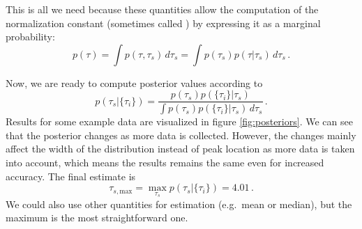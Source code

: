 \begin{ex}
This is all we need because these quantities allow the computation of the normalization constant (sometimes called ) by expressing it as a marginal probability:
\begin{equation*}
p(\tau) = \int p(\tau, \tau_s) \, d\tau_s = \int p(\tau_s) p(\tau | \tau_s) \, d\tau_s \, .
\end{equation*}


Now, we are ready to compute posterior values according to
\begin{equation*}
p(\tau_s | \{\tau_i\}) = \frac{p(\tau_s) p(\{\tau_i\} | \tau_s)}{\int p(\tau_s) p(\{\tau_i\} | \tau_s) \, d\tau_s} \, .
\end{equation*}
Results for some example data are visualized in figure \ref{fig:posteriors}. We can see that the posterior changes as more data is collected. However, the changes mainly affect the width of the distribution instead of peak location as more data is taken into account, which means the results remains the same even for increased accuracy. The final estimate is
\begin{equation*}
\tau_{s, \text{max}} = \max_{\tau_s} p(\tau_s | \{\tau_i\}) = 4.01 \, .
\end{equation*}
We could also use other quantities for estimation (e.g.~mean or median), but the maximum is the most straightforward one.
\end{ex}




